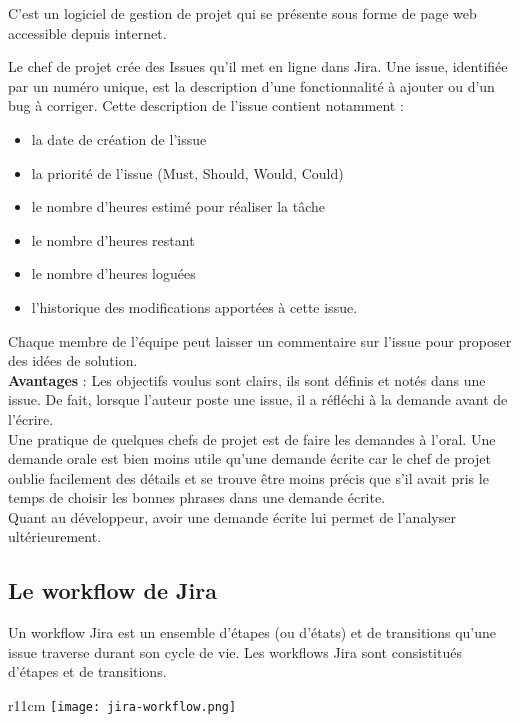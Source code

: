 C'est un logiciel de gestion de projet qui se présente sous forme de page web
accessible depuis internet.

Le chef de projet crée des Issues qu'il met en ligne dans Jira.
Une issue, identifiée par un numéro unique, est la description d'une
fonctionnalité à ajouter ou d'un bug à corriger. 
Cette description de l'issue contient notamment :
\begin{itemize}
\item la date de création de l'issue
\item la priorité de l'issue (Must, Should, Would, Could)
\item le nombre d'heures estimé pour réaliser la tâche
\item le nombre d'heures restant
\item le nombre d'heures loguées
\item l'historique des modifications apportées à cette issue.\\

\end{itemize}

Chaque membre de l'équipe peut laisser un commentaire sur l'issue pour
proposer des idées de solution.\\
\clearpage
\textbf{Avantages} :
Les objectifs voulus sont clairs, ils sont définis et notés dans une issue.
De fait, lorsque l'auteur poste une issue, il a réfléchi à la demande avant de
l'écrire. \\
Une pratique de quelques chefs de projet est de faire les demandes à l'oral.
Une demande orale est bien moins utile qu'une demande écrite car le chef de
projet oublie facilement des détails et se trouve être moins précis que s'il
avait pris le temps de choisir les bonnes phrases dans une demande écrite.\\
Quant au développeur, avoir une demande écrite lui permet de l'analyser
ultérieurement.


\subsection{Le workflow de Jira}

Un workflow Jira est un ensemble d'étapes (ou d'états) et de transitions qu'une
issue traverse durant son cycle de vie. Les workflows Jira sont consistitués
d'étapes et de transitions.

\begin{wrapfigure}[13]{r}{11cm}
  \texttt{[image: jira-workflow.png]}
\end{wrapfigure}

